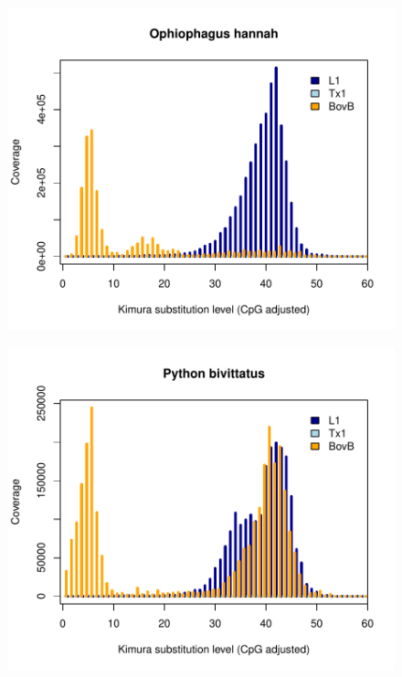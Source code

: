\documentclass[12pt,a4paper,times]{article}
\begin{document}
\begin{figure}[H]
	\centering
	\includegraphics[scale=0.8]{suppFigures/divergencePlots/Ophiophagus_hannah.pdf}
	\caption{\label{Ophiophagus_hannah}}
\end{figure}

\begin{figure}[H]
	\centering
	\includegraphics[scale=0.8]{suppFigures/divergencePlots/Python_bivittatus.pdf}
	\caption{\label{Python_bivittatus}}
\end{figure}
\end{document}
